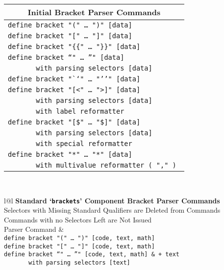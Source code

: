 \documentclass[12pt]{article}
\makeatletter
\newcommand{\TT}[1]{{\tt \bfseries #1}}
\newcommand{\ttkey}[1]{\TT{#1}\index{#1@\TT{#1}}}
\makeatother
\begin{document}
\begin{center}\label{UNTYPED-BRACKET-BUILTINS}
\begin{tabular}{l}
\multicolumn{1}{c}{\bf Initial Bracket Parser Commands}
\\\hline
\tt define bracket "(" \ldots~")" [data] \\
\tt define bracket "[" \ldots~"]" [data] \\
\tt define bracket "\{\{" \ldots~"\}\}" [data] \\
\tt define bracket "`" \ldots~"'" [data] \\
\tt ~~~~~~~with parsing selectors [data] \\
\tt define bracket "``" \ldots~"''" [data] \\
\tt define bracket "[<" \ldots~">]" [data] \\
\tt ~~~~~~~with parsing selectors [data] \\
\tt ~~~~~~~with label reformatter \\
\tt define bracket "[\$" \ldots~"\$]" [data] \\
\tt ~~~~~~~with parsing selectors [data] \\
\tt ~~~~~~~with special reformatter \\
\tt define bracket "{*" \ldots~"*}" [data] \\
\tt ~~~~~~~with multivalue reformatter ( "," ) \\
\end{tabular}
\\[2ex]
\begin{tabular}{l@{\hspace*{0.2in}}l}
{\bf Standard `\ttkey{brackets}'\label{STANDARD-BRACKETS-1} Component
     Bracket Parser Commands}
\\[1ex]
{Selectors with Missing Standard Qualifiers are Deleted from Commands} \\
{Commands with no Selectors Left are Not Issued}
\\[1ex]
Parser Command				& 
\\\hline
\tt define bracket "(" \ldots~")" [code, text, math] \\
\tt define bracket "[" \ldots~"]" [code, text, math] \\
\tt define bracket "`" \ldots~"'" [code, text, math]	     & \tt + text \\
\tt ~~~~~~~with parsing selectors [text] \\

\end{tabular}
\end{center}
\end{document}
